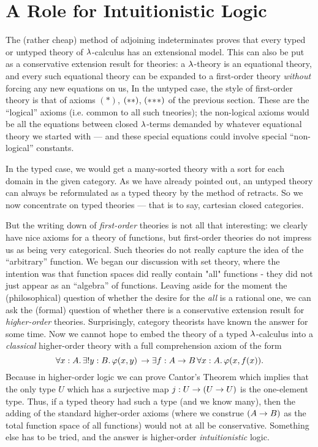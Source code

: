 \section{A Role for Intuitionistic Logic}

The (rather cheap) method of adjoining indeterminates proves that every typed or untyped theory of $\l$-calculus has an extensional model. This can also be put as a conservative extension result for theories: a $\l$-theory is an equational theory, and every such equational theory can be expanded to a first-order theory {\it without} forcing any new equations on us,  In the untyped case, the style of first-order theory is that of axioms $(*)$, $\ss$, $\sss$ of the previous section. These are the ``logical'' axioms (i.e. common to all such tneories); the non-logical axioms would be all the equations between closed $\l$-terms demanded by whatever equational theory we started with --- and these special equations could involve special ``non-logical'' constants.

In the typed case, we would get a many-sorted theory with a sort for each domain in the given category. As we have already pointed out, an untyped theory can always be reformulated as a typed theory by the method of retracts. So we now concentrate on typed theories --- that is to say, cartesian closed categories.

But the writing down of {\it first-order} theories is not all that interesting: we clearly have nice axioms for a theory of functions, but first-order theories do not impress us as being very categorical. Such theories do not really capture the idea of the ``arbitrary'' function. We began our discussion with set theory, where the intention was that function spaces did really contain "all" functions - they did not just appear as an ``algebra'' of functions. Leaving aside for the moment the (philosophical) question of whether the desire for the {\it all} is a rational one, we can ask the (formal) question of whether there is a conservative extension result for {\it higher-order} theories. Surprisingly, category theorists have known the answer for some time.
Now we cannot hope to embed the theory of a typed $\l$-calculus into a {\it classical} higher-order theory with a full comprehension axiom of the form
$$
\forall x:A .\,	\exists !y: B .\,  \ffam(x,y)  \, \to  \exists f: \AB \, \forall x: A .\, \ffam(x,f(x)).
$$
Because in higher-order logic we can prove Cantor's Theorem which implies that the only type $U$ which has a surjective map
$j : U \to	\UU$ is the one-element type. Thus, if a typed theory had such a type (and we know many), then the adding of the
standard higher-order axioms (where we construe $(\AB)$ as the total function space of all functions) would not at all be conservative. Something else has to be tried, and the answer is higher-order {\it intuitionistic} logic.

